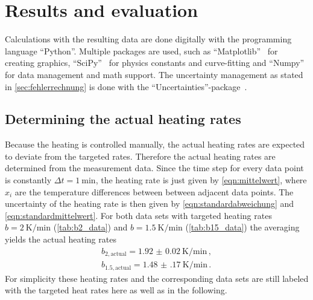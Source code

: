 \section{Results and evaluation}
\label{sec:Auswertung}
Calculations with the resulting data are done digitally with the programming language \enquote{Python}.
Multiple packages are used, such as \enquote{Matplotlib}~\cite{matplotlib} for creating graphics, \enquote{SciPy}~\cite{scipy} for physics constants and curve-fitting and \enquote{Numpy}~\cite{numpy} for data management and math support.
The uncertainty management as stated in \autoref{sec:fehlerrechnung} is done with the \enquote{Uncertainties}-package~\cite{uncertainties}.


\subsection{Determining the actual heating rates}
Because the heating is controlled manually, the actual heating rates are expected to deviate from the targeted rates. 
Therefore the actual heating rates are determined from the measurement data. %
Since the time step for every data point is constantly $\Delta t = \qty{1}{\minute}$, the heating rate is just given by \autoref{eqn:mittelwert}, where $x_i$ are the temperature differences between between adjacent data points. 
The uncertainty of the heating rate is then given by \autoref{eqn:standardabweichung} and \autoref{eqn:standardmittelwert}.
For both data sets with targeted heating rates $b=\qty{2}{\kelvin \per \minute}$ (\autoref{tab:b2_data}) and $b=\qty{1.5}{\kelvin \per \minute}$ (\autoref{tab:b15_data}) the averaging yields the actual heating rates
\begin{align*}
  b_{2, \mathrm{actual}}= \qty{1.92(2)}{\kelvin\per\minute} \, , \\
  b_{1.5, \mathrm{actual}}= \qty{1.48(17)}{\kelvin\per\minute} \, .
\end{align*}
For simplicity these heating rates and the corresponding data sets are still labeled with the targeted heat rates here as well as in the following. 


